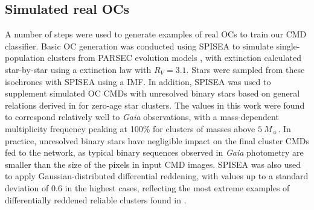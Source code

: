 

\subsection{Simulated real OCs}\label{c3:sec:cmd_classifier:tps}

A number of steps were used to generate examples of real OCs to train our CMD classifier. Basic OC generation was conducted using SPISEA \citep{hosek_jr_pypopstar_2020} to simulate single-population clusters from PARSEC evolution models \citep{marigo_new_2017}, with extinction calculated star-by-star using a \cite{cardelli_relationship_1989} extinction law with $R_V=3.1$. Stars were sampled from these isochrones with SPISEA using a \cite{kroupa_variation_2001} IMF. In addition, SPISEA was used to supplement simulated OC CMDs with unresolved binary stars based on general relations derived in \cite{lu_stellar_2013} for zero-age star clusters. The values in this work were found to correspond relatively well to \emph{Gaia} observations, with a mass-dependent multiplicity frequency peaking at 100\% for clusters of masses above $5~M_{\sun}$. In practice, unresolved binary stars have negligible impact on the final cluster CMDs fed to the network, as typical binary sequences observed in \emph{Gaia} photometry are smaller than the size of the pixels in input CMD images. SPISEA was also used to apply Gaussian-distributed differential reddening, with values up to a standard deviation of 0.6 in the highest cases, reflecting the most extreme examples of differentially reddened reliable clusters found in \cite{cantat-gaudin_clusters_2020}.


